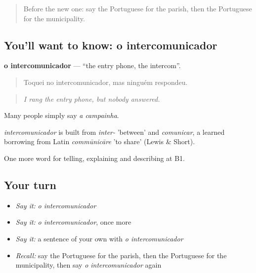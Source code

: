 \label{lesson:PT-C440-intercomunicador}



\begin{quote}
Before the new one: say the Portuguese for the parish, then the Portuguese for the municipality.
\end{quote}

\subsection*{You'll want to know: o intercomunicador}
\textbf{o intercomunicador} — \textquotedblleft{}the entry phone, the intercom\textquotedblright{}.

\begin{quote}
Toquei no intercomunicador, mas ninguém respondeu.
\end{quote}

\begin{quote}
\emph{I rang the entry phone, but nobody answered.}
\end{quote}

Many people simply say \emph{a campainha}.

\begin{cousinweb}
\emph{intercomunicador} is built from \emph{inter-} 'between' and \emph{comunicar}, a learned borrowing from Latin \emph{commūnicāre} 'to share' (Lewis \& Short).
\end{cousinweb}

\begin{grammarlens}[title={What you've built}]
One more word for telling, explaining and describing at B1.
\end{grammarlens}

\subsection*{Your turn}
\begin{itemize}
\raggedright
  \item \emph{Say it:} \emph{o intercomunicador}
  \item \emph{Say it:} \emph{o intercomunicador}, once more
  \item \emph{Say it:} a sentence of your own with \emph{o intercomunicador}
  \item \emph{Recall:} say the Portuguese for the parish, then the Portuguese for the municipality, then say \emph{o intercomunicador} again
\end{itemize}

